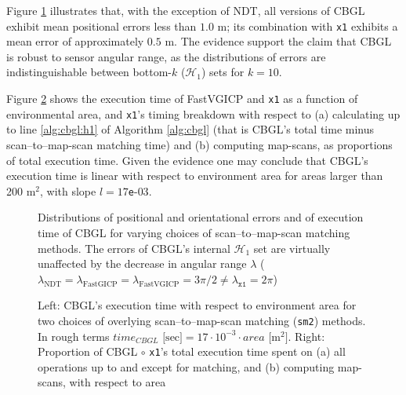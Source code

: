 Figure \ref{fig:c:errors_and_time} illustrates that, with the exception of
NDT, all versions of CBGL exhibit mean positional errors less than $1.0$ m; its
combination with \texttt{x1} exhibits a mean error of approximately $0.5$ m.
The evidence support the claim that CBGL is robust to sensor angular range,
as the distributions of errors are indistinguishable between bottom-$k$
($\mathcal{H}_1$) sets for $k=10$.

Figure \ref{fig:c:time_analysis} shows the execution time of FastVGICP and
\texttt{x1} as a function of environmental area, and \texttt{x1}'s timing
breakdown with respect to (a) calculating up to line \ref{alg:cbgl:h1} of
Algorithm \ref{alg:cbgl} (that is CBGL's total time minus scan--to--map-scan
matching time) and (b) computing map-scans, as proportions of total execution
time. Given the evidence one may conclude that CBGL's execution time is linear
with respect to environment area for areas larger than 200 m$^2$, with slope
$l = 17$\texttt{e}-$03$.

\begin{figure}
  
  \vspace{0.1cm}
  \caption{\small Distributions of positional and orientational errors and of
           execution time of CBGL for varying choices of scan--to--map-scan
           matching methods. The errors of CBGL's internal $\mathcal{H}_1$ set
           are virtually unaffected by the decrease in angular range $\lambda$
           ($\lambda_{\text{NDT}} = \lambda_{\text{FastGICP}} =
           \lambda_{\text{FastVGICP}} = 3\pi/2 \neq \lambda_{\texttt{x1}} = 2\pi$)
           }
  \label{fig:c:errors_and_time}
\end{figure}

\begin{figure}
  \vspace{0.5cm}
  
  \vspace{0.6cm}
  \caption{\small Left: CBGL's execution time with respect to environment area
           for two choices of overlying scan--to--map-scan matching
           (\texttt{sm2}) methods. In rough terms
           $time_{CBGL} \text{ [sec]} = 17\cdot10^{-3}\cdot area \text{ [} \text{m}^2 \text{]}$.
           Right: Proportion of CBGL $\circ$ \texttt{x1}'s total execution time
           spent on (a) all operations up to and except for matching, and (b)
           computing map-scans, with respect to area}
  \label{fig:c:time_analysis}
\end{figure}
